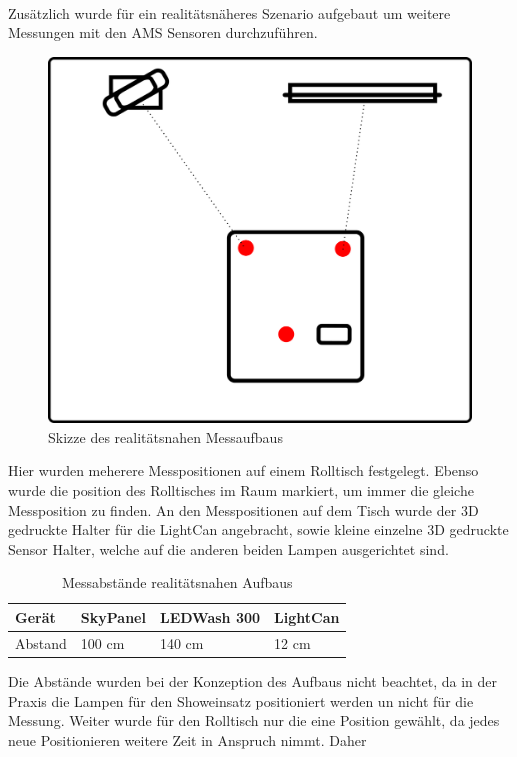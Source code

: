 \documentclass[11pt]{scrartcl}
\begin{document}
\\
Zusätzlich wurde für ein realitätsnäheres Szenario aufgebaut um weitere Messungen mit den AMS Sensoren durchzuführen.
\begin{figure}[H]
    \begin{center}
        \includegraphics[width=.8\textwidth]{images/meassureScenarioRealistic.png}
    \end{center}
    \caption{Skizze des realitätsnahen Messaufbaus} \label{fig:measureScribbleReal}
\end{figure}
\noindent
Hier wurden meherere Messpositionen auf einem Rolltisch festgelegt. Ebenso wurde die position des Rolltisches im Raum markiert, um immer die
gleiche Messposition zu finden. An den Messpositionen auf dem Tisch wurde der 3D gedruckte Halter für die LightCan angebracht, sowie kleine
einzelne 3D gedruckte Sensor Halter, welche auf die anderen beiden Lampen ausgerichtet sind.
\begin{table}[H]
    \begin{tabularx}{\textwidth}{|l|X|X|X|}
        \hline Gerät  & SkyPanel & LEDWash 300 & LightCan\\\hline
        Abstand       & 100 cm   & 140 cm      & 12 cm   \\\hline
    \end{tabularx}
    \caption{Messabstände realitätsnahen Aufbaus}
\end{table}
\noindent
Die Abstände wurden bei der Konzeption des Aufbaus nicht beachtet, da in der Praxis die Lampen für den Showeinsatz positioniert werden un nicht
für die Messung. Weiter wurde für den Rolltisch nur die eine Position gewählt, da jedes neue Positionieren weitere Zeit in Anspruch nimmt. Daher
\end{document}
